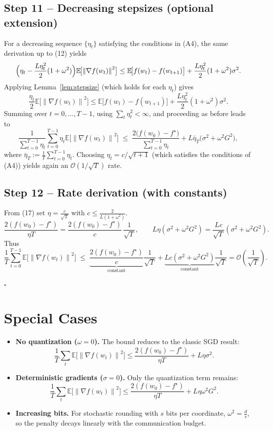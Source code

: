 \documentclass{article}
\newcommand{\E}{\mathbb{E}}
\newcommand{\norm}[1]{\left\lVert#1\right\rVert}
\begin{document}
\subsection*{Step 11 – Decreasing stepsizes (optional extension)}
For a decreasing sequence $\{\eta_{t}\}$ satisfying the conditions in (A4), the same derivation up to (12) yields
\[
\Bigl(\eta_{t}-\frac{L\eta_{t}^{2}}{2}(1+\omega^{2})\Bigr)
\E\!\bigl[\norm{\nabla f(w_{t})}^{2}\bigr]
\le \E\!\bigl[f(w_{t})-f(w_{t+1})\bigr]
      +\frac{L\eta_{t}^{2}}{2}(1+\omega^{2})\sigma^{2}.
\]
Applying Lemma~\ref{lem:stepsize} (which holds for each $\eta_{t}$) gives
\[
\frac{\eta_{t}}{2}\E\!\bigl[\norm{\nabla f(w_{t})}^{2}\bigr]
\le \E\!\bigl[f(w_{t})-f(w_{t+1})\bigr]
      +\frac{L\eta_{t}^{2}}{2}(1+\omega^{2})\sigma^{2}.
\]
Summing over $t=0,\dots,T-1$, using $\sum_{t}\eta_{t}^{2}<\infty$, and proceeding as before leads to
\[
\frac{1}{\sum_{t=0}^{T-1}\eta_{t}}
\sum_{t=0}^{T-1}\eta_{t}\E\!\bigl[\norm{\nabla f(w_{t})}^{2}\bigr]
\;\le\;
\frac{2\bigl(f(w_{0})-f^{\star}\bigr)}{\sum_{t=0}^{T-1}\eta_{t}}
+ L\bar\eta_{T}\bigl(\sigma^{2}+\omega^{2}G^{2}\bigr),
\]
where $\bar\eta_{T}:=\frac{1}{T}\sum_{t=0}^{T-1}\eta_{t}$.  Choosing $\eta_{t}=c/\sqrt{t+1}$ (which satisfies the conditions of (A4)) yields again an $\mathcal{O}(1/\sqrt{T})$ rate.

\subsection*{Step 12 – Rate derivation (with constants)}
From (17) set $\eta = \frac{c}{\sqrt{T}}$ with $c\le\frac{2}{L(1+\omega^{2})}$.
\[
\frac{2(f(w_{0})-f^{\star})}{\eta T}
= \frac{2(f(w_{0})-f^{\star})}{c}\,\frac{1}{\sqrt{T}},\qquad
L\eta(\sigma^{2}+\omega^{2}G^{2})
= \frac{Lc}{\sqrt{T}}(\sigma^{2}+\omega^{2}G^{2}).
\]
Thus
\[
\frac{1}{T}\sum_{t=0}^{T-1}\E\!\bigl[\norm{\nabla f(w_{t})}^{2}\bigr]
\;\le\;
\underbrace{\frac{2(f(w_{0})-f^{\star})}{c}}_{\text{constant}}
\frac{1}{\sqrt{T}}
+\underbrace{Lc(\sigma^{2}+\omega^{2}G^{2})}_{\text{constant}}
\frac{1}{\sqrt{T}}
= \mathcal{O}\!\left(\frac{1}{\sqrt{T}}\right).
\]

\hfill $\square$

\section*{Special Cases}
\begin{itemize}
\item \textbf{No quantization ($\omega=0$).}  The bound reduces to the classic SGD result:
\[
\frac{1}{T}\sum_{t}\E\!\bigl[\norm{\nabla f(w_{t})}^{2}\bigr]
\le \frac{2(f(w_{0})-f^{\star})}{\eta T}+L\eta\sigma^{2}.
\]
\item \textbf{Deterministic gradients ($\sigma=0$).}  Only the quantization term remains:
\[
\frac{1}{T}\sum_{t}\E\!\bigl[\norm{\nabla f(w_{t})}^{2}\bigr]
\le \frac{2(f(w_{0})-f^{\star})}{\eta T}+L\eta\omega^{2}G^{2}.
\]
\item \textbf{Increasing bits.}  For stochastic rounding with $s$ bits per coordinate,
$\omega^{2}= \frac{d}{s}$, so the penalty decays linearly with the communication budget.
\end{itemize}
\end{document}
